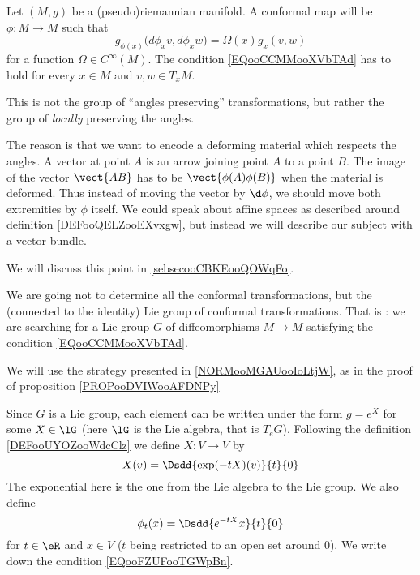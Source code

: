 \begin{definition}
Let \( (M,g)\) be a (pseudo)riemannian manifold. A conformal map will be \( \phi\colon M\to M\) such that
\begin{equation}        \label{EQooCCMMooXVbTAd}
    g_{\phi(x)}\big( d\phi_xv,d\phi_xw \big)=\Omega(x)g_x(v,w)
\end{equation}
for a function \( \Omega\in C^{\infty}(M)\). The condition \eqref{EQooCCMMooXVbTAd} has to hold for every \( x\in M\) and \( v,w\in T_xM\).
\end{definition}
    

\begin{normaltext}  \label{NorooVEVOooRBpvXF}
    This is not the group of ``angles preserving'' transformations, but rather the group of \emph{locally} preserving the angles.

The reason is that we want to encode a deforming material which respects the angles. A vector at point \( A\) is an arrow joining point \( A\) to a point \( B\). The image of the vector \( \vect{ AB }\) has to be \( \vect{ \phi(A)\phi(B) }\) when the material is deformed. Thus instead of moving the vector by \( \d\phi\), we should move both extremities by \( \phi\) itself. We could speak about affine spaces as described around definition \ref{DEFooQELZooEXvxgw}, but instead we will describe our subject with a vector bundle.

We will discuss this point in \ref{sebsecooCBKEooQOWqFo}.
\end{normaltext}

\begin{normaltext}
    We are going not to determine all the conformal transformations, but the (connected to the identity) Lie group of conformal transformations. That is : we are searching for a Lie group \( G\) of diffeomorphisms \( M\to M\) satisfying the condition \eqref{EQooCCMMooXVbTAd}.
\end{normaltext}

We will use the strategy presented in \ref{NORMooMGAUooIoLtjW}, as in the proof of proposition \ref{PROPooDVIWooAFDNPy}

Since \( G\) is a Lie group, each element can be written under the form \( g= e^{X}\) for some \( X\in\lG\) (here \( \lG\) is the Lie algebra, that is \( T_eG\)). Following the definition \ref{DEFooUYOZooWdcClz} we define \( X\colon V\to V\) by
\begin{equation}
    X(v)=\Dsdd{  \exp(-tX)(v) }{t}{0}
\end{equation}
The exponential here is the one from the Lie algebra to the Lie group. We also define
\begin{equation}
    \phi_t(x)=\Dsdd{  e^{-tX}x }{t}{0}
\end{equation}
for \( t\in \eR\) and \( x\in V\) (\( t\) being restricted to an open set around \( 0\)). We write down the condition \eqref{EQooFZUFooTGWpBn}.



